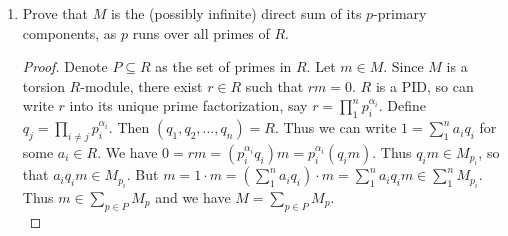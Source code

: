 \documentclass[8pt]{amsart}
\theoremstyle{plain}%
\theoremstyle{definition}
\theoremstyle{remark}
\numberwithin{equation}{section}
\newcommand{\N}{\mathbb{N}}
\begin{document}
\begin{enumerate}
\begin{proof}
				Conversely suppose that $m \in M_{p_i}$ then by definition there exists $j \in \N$ such that $p_i^jm = 0$. Consider $(a, p_i^j)$ and observe that since $R$ is a PID, it must follow that $(a, p_i^j) = (b)$ for some $b \in R$. But also note that $(p_i^j) \subseteq (a, p_i^j) = (b)$, so by property of ideals, we have $b \mid p_i^j$ which leads us to conclude by property of primes that $b = p_i^t$ for some $t \leq j$. But we also know that $(a) \subseteq (p_i^t)$ so it follows that
				\begin{align*}
					p_i^t &\mid p_1^{\alpha_1} \cdots p_{i - 1}^{\alpha_{i - 1}} p_i^{\alpha_i} p_{i + 1}^{\alpha_{i + 1}} \cdots p_n^{\alpha_n}\\
					p_i^{t - \alpha_i}p_i^{\alpha_i} &\mid  p_1^{\alpha_1} \cdots p_{i - 1}^{\alpha_{i - 1}} p_i^{\alpha_i} p_{i + 1}^{\alpha_{i + 1}} \cdots p_n^{\alpha_n}\\
					p_i^{t - \alpha_i} &\mid  p_1^{\alpha_1} \cdots p_{i - 1}^{\alpha_{i - 1}} p_{i + 1}^{\alpha_{i + 1}} \cdots p_n^{\alpha_n}
				\end{align*}
				So by definition $  p_1^{\alpha_1} \cdots p_{i - 1}^{\alpha_{i - 1}} p_{i + 1}^{\alpha_{i + 1}} \cdots p_n^{\alpha_n} = p_i^{t - \alpha_i}s$ for some $s \in R$. It must follow that $t - \alpha_i = 0$, or equivalently $t = \alpha_i$, because if it does not, we have a contradiction, since $p_i$ is not in $\{p_1, \ldots, p_{i-1}, p_{i + 1}, \ldots, p_n\}$. So since $(p_i^j) \subseteq (a, p_i^j) =  (p_i^{\alpha_i})$ we have $p_i^{\alpha_i} = p_i^j \cdot k$ for some $k \in R$. So $p_i^{\alpha_i}m = p_i^j \cdot k \cdot m = k \cdot (p_i^j \cdot m) = k \cdot 0 = 0$. Conclude that $m \in M_i$ and hence $M_{p_i} \subseteq M_i$.\\

				Finally, by double inclusion, we can conclude that $M_i = M_{p_i}$.
			\end{proof}
		\item Prove that $M$ is the (possibly infinite) direct sum of its $p$-primary components, as $p$ runs over all primes of $R$.
		\begin{proof}
		
		Denote $P \subseteq R$ as the set of primes in $R$. Let $m \in M$. Since $M$ is a torsion $R$-module, there exist $r \in R$ such that $rm =0$. $R$ is a PID, so can write $r$ into its unique prime factorization, say $r = \prod_1^n p_i^{\alpha_i}$. Define $q_j = \prod_{i\neq j} p_i^{\alpha_i}$. Then $(q_1,q_2,...,q_n) = R$. 
		Thus we can write $1 = \sum_1^n a_iq_i$ for some $a_i \in R$. We have $0 = rm = (p_i^{\alpha_i}q_i)m = p_i^{\alpha_i}(q_im)$. Thus $q_im \in M_{p_i}$, so that $a_iq_im \in M_{p_i}$. But $m = 1\cdot m = (\sum_1^n a_iq_i )\cdot m = \sum_1^n a_iq_im \in \sum_1^n M_{p_i}$. Thus $m \in \sum_{p \in P} M_p$ and we have $M = \sum_{p \in P} M_p$. \\
		

\end{proof}
\end{enumerate}
\end{document}
